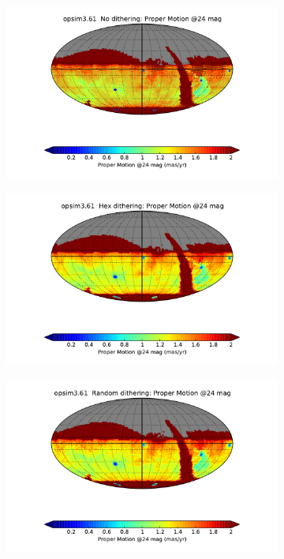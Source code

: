 \documentclass[]{spie}  %
\begin{document}
\begin{figure}
\begin{subfigure}[]{0.3\textwidth}
\includegraphics[width=\textwidth]{figures/opsim3_61_Proper_Motion_@24_mag__No_dithering_HEAL_SkyMap}
\caption[]{}
\label{subfig:pm24no}
\end{subfigure}
\begin{subfigure}[]{0.3\textwidth}
\includegraphics[width=\textwidth]{figures/opsim3_61_Proper_Motion_@24_mag__Hex_dithering_HEAL_SkyMap}
\caption[]{}
\label{subfig:pm24hex}
\end{subfigure}
\begin{subfigure}[]{0.3\textwidth}
\includegraphics[width=\textwidth]{figures/opsim3_61_Proper_Motion_@24_mag__Random_dithering_HEAL_SkyMap}
\caption[]{}
\label{subfig:pm24random}
\end{subfigure}


\end{figure}
\end{document}
